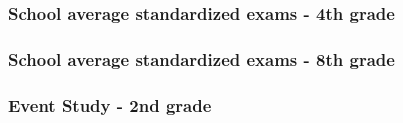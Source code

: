\documentclass{beamer}
\begin{document}
\begin{frame}
    \label{update_scott}
    \frametitle{School average standardized exams - 4th grade}
        {
    }
\end{frame}

\begin{frame}
    \label{update_scott}
    \frametitle{School average standardized exams - 8th grade}
        {
    }
\end{frame}


\begin{frame}
    \label{update_scott}
    \frametitle{Event Study - 2nd grade}
 {
    }
\end{frame}
\end{document}
